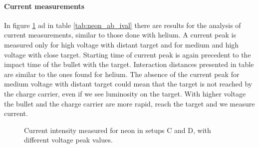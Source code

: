 \paragraph{Current measurements}
In figure \ref{fig:neon_ab_icurr} ad in table \ref{tab:neon_ab_ival} there are results for the analysis of current measurements, similar to those done with helium. A current peak is measured only for high voltage with distant target and for medium and high voltage with close target. Starting time of current peak is again precedent to the impact time of the bullet with the target. Interaction distances presented in table are similar to the ones found for helium.
The absence of the current peak for medium voltage with distant target could mean that the target is not reached by the charge carrier, even if we see luminosity on the target. With higher voltage the bullet and the charge carrier are more rapid, reach the target and we measure current.
\begin{figure}[h]
 \centering
 \hfill
 \caption{Current intensity measured for neon in setups C and D, with different voltage peak values.}
 \label{fig:neon_ab_icurr}
\end{figure}
